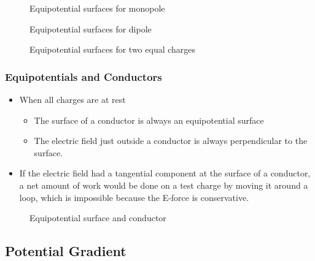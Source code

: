 \begin{figure}[ht]
    \centering
    \caption{Equipotential surfaces for monopole}
    \label{fig:equipotential-surfaces-for-monopole}
\end{figure}


\begin{figure}[ht]
    \centering
    \caption{Equipotential surfaces for dipole}
    \label{fig:equipotential-surfaces-for-dipole}
\end{figure}

\begin{figure}[ht]
    \centering
    \caption{Equipotential surfaces for two equal charges}
    \label{fig:equipotential-surfaces-for-two-equal-charges}
\end{figure}


\subsubsection{Equipotentials and Conductors}%
\label{ssub:equipotentials_and_conductors}

\begin{itemize}
	\item When all charges are at rest
		\begin{itemize}
			\item The surface of a conductor is always an equipotential surface
			\item The electric field just outside a conductor is always perpendicular to the surface.
		\end{itemize}
	\item If the electric field had a tangential component at the surface of a conductor, a
		net amount of work would be done on a test charge by moving it around a loop, which
		is impossible because the E-force is conservative.
\end{itemize}

\begin{figure}[ht]
    \centering
    \caption{Equipotential surface and conductor}
    \label{fig:equipotential-surface-and-conductor}
\end{figure}

\subsection{Potential Gradient}%
\label{sub:potential_gradient}


